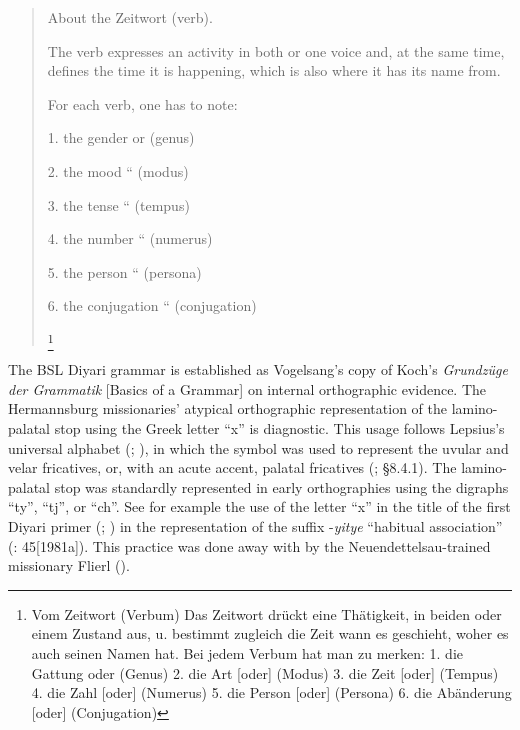 \begin{quote}
About the Zeitwort (verb).



The verb expresses an activity in both or one voice and, at the same time, defines the time it is happening, which is also where it has its name from.



For each verb, one has to note:



1. the gender  or  (genus)



2. the mood  “  (modus)



3. the tense  “  (tempus)



4. the number  “  (numerus)



5. the person  “  (persona)



6. the conjugation  “  (conjugation)

\citep{koch_untitled_1868}\footnote{Vom Zeitwort (Verbum) Das Zeitwort drückt eine Thätigkeit, in beiden oder einem Zustand aus, u. bestimmt zugleich die Zeit wann es geschieht, woher es auch seinen Namen hat. Bei jedem Verbum hat man zu merken: 1. die Gattung oder (Genus) 2. die Art [oder] (Modus) 3. die Zeit [oder] (Tempus) 4. die Zahl [oder] (Numerus)  5. die Person [oder] (Persona) 6. die Abänderung [oder] (Conjugation)}
\end{quote}

The BSL Diyari grammar is established as Vogelsang’s copy of Koch’s \textit{Grund\-zü\-ge der Grammatik} [Basics of a Grammar] \citeyearpar{koch_untitled_1868} on internal orthographic evidence. The Hermannsburg missionaries' atypical orthographic representation of the lamino-palatal stop using the Greek letter “x” is diagnostic. This usage follows Lepsius’s universal alphabet (\citeyear{lepsius_allgemeine_1855}; \citeyear{lepsius_standard_1863}), in which the symbol was used to represent the uvular and velar fricatives, or, with an acute accent, palatal fricatives (\citealt[323--324]{whitney_lepsiuss_1861}; \citealt{Stockigt2017} §8.4.1). The lamino-palatal stop was standardly represented in early orthographies using the digraphs “ty'', “tj'', or “ch''. See for example the use of the letter “x” in the title of the first Diyari primer (\citealt{koch_nujanujarajinkiniexa_1870}; ) in the representation of the suffix -\textit{yitye} “habitual association” (\citealt{austin_grammar_2013}: 45[1981a]). This practice was done away with by the Neuendettelsau-trained missionary Flierl ().

